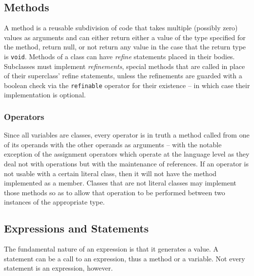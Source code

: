 \subsection{Methods}
A method is a reusable subdivision of code that takes multiple (possibly zero) values as arguments and can either return either a value of the type specified for the method, return null, or not return any value in the case that the return type is \verb!void!. Methods of a class can have \textit{refine} statements placed in their bodies. Subclasses must implement \textit{refinements}, special methods that are called in place of their superclass' refine statements, unless the refinements are guarded with a boolean check via the \verb!refinable! operator for their existence -- in which case their implementation is optional.

\subsubsection{Operators}
Since all variables are classes, every operator is in truth a method called from one of its operands with the other operands as arguments -- with the notable exception of the assignment operators which operate at the language level as they deal not with operations but with the maintenance of references. If an operator is not usable with a certain literal class, then it will not have the method implemented as a member. Classes that are not literal classes may implement those methods so as to allow that operation to be performed between two instances of the appropriate type.

\subsection{Expressions and Statements}
The fundamental nature of an expression is that it generates a value. A statement can be a call to an expression, thus a method or a variable. Not every statement is an expression, however.
